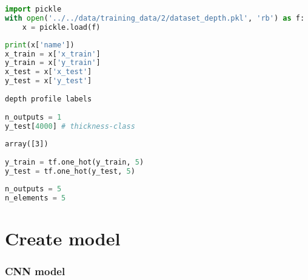 \begin{lstlisting}[language=Python]
import pickle
with open('../../data/training_data/2/dataset_depth.pkl', 'rb') as f:
    x = pickle.load(f)
\end{lstlisting}

\begin{lstlisting}[language=Python]
print(x['name'])
x_train = x['x_train']
y_train = x['y_train']
x_test = x['x_test']
y_test = x['y_test']
\end{lstlisting}

\begin{lstlisting}
depth profile labels
\end{lstlisting}

\begin{lstlisting}[language=Python]
n_outputs = 1
y_test[4000] # thickness-class
\end{lstlisting}

\begin{lstlisting}
array([3])
\end{lstlisting}

\begin{lstlisting}[language=Python]
y_train = tf.one_hot(y_train, 5)
y_test = tf.one_hot(y_test, 5)
\end{lstlisting}

\begin{lstlisting}[language=Python]
n_outputs = 5
n_elements = 5
\end{lstlisting}

\hypertarget{create-model}{%
\section*{Create model}\label{create-model}}

\hypertarget{cnn-model}{%
\subsubsection*{CNN model}\label{cnn-model}}

